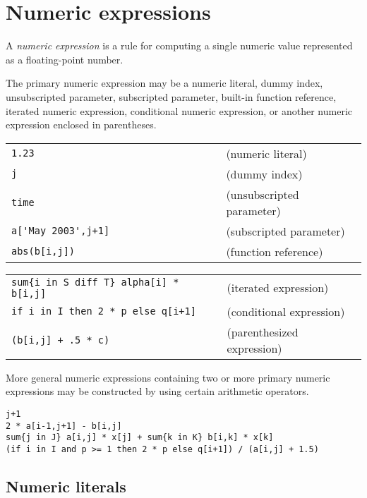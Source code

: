 \documentclass[11pt]{report}
\def\para#1{\noindent{\bf#1}}
\begin{document}
\vspace*{-8pt}

\section{Numeric expressions}

A {\it numeric expression} is a rule for computing a single numeric
value represented as a floating-point number.

The primary numeric expression may be a numeric literal, dummy index,
unsubscripted parameter, subscripted parameter, built-in function
reference, iterated numeric expression, conditional numeric expression,
or another numeric expression enclosed in parentheses.

\para{Examples}

\noindent
\begin{tabular}{@{}ll@{}}
\verb|1.23                                |&(numeric literal)\\
\verb|j|&(dummy index)\\
\verb|time|&(unsubscripted parameter)\\
\verb|a['May 2003',j+1]|&(subscripted parameter)\\
\verb|abs(b[i,j])|&(function reference)\\
\end{tabular}

\newpage

\noindent
\begin{tabular}{@{}ll@{}}
\verb|sum{i in S diff T} alpha[i] * b[i,j]|&(iterated expression)\\
\verb|if i in I then 2 * p else q[i+1]|&(conditional expression)\\
\verb|(b[i,j] + .5 * c)|&(parenthesized expression)\\
\end{tabular}

More general numeric expressions containing two or more primary numeric
expressions may be constructed by using certain arithmetic operators.

\para{Examples}

\begin{verbatim}
j+1
2 * a[i-1,j+1] - b[i,j]
sum{j in J} a[i,j] * x[j] + sum{k in K} b[i,k] * x[k]
(if i in I and p >= 1 then 2 * p else q[i+1]) / (a[i,j] + 1.5)
\end{verbatim}

\subsection{Numeric literals}
\end{document}
